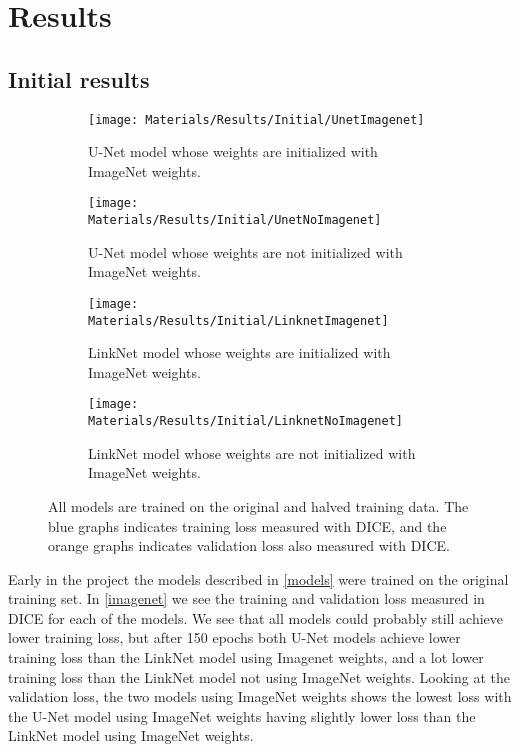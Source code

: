 \section{Results}
\subsection{Initial results}
\begin{figure}
	\centering
	\begin{subfigure}[b]{0.24\linewidth}
		\centering
		\texttt{[image: Materials/Results/Initial/UnetImagenet]}
		\caption{U-Net model whose weights are initialized with ImageNet weights.}
	\end{subfigure}
	\hfill
	\begin{subfigure}[b]{0.24\linewidth}
		\centering
		\texttt{[image: Materials/Results/Initial/UnetNoImagenet]}
		\caption{U-Net model whose weights are not initialized with ImageNet weights.}
	\end{subfigure}
	\hfill
	\begin{subfigure}[b]{0.24\linewidth}
		\centering
		\texttt{[image: Materials/Results/Initial/LinknetImagenet]}
		\caption{LinkNet model whose weights are initialized with ImageNet weights.}
	\end{subfigure}
	\hfill
	\begin{subfigure}[b]{0.24\linewidth}
		\centering
		\texttt{[image: Materials/Results/Initial/LinknetNoImagenet]}
		\caption{LinkNet model whose weights are not initialized with ImageNet weights.}
	\end{subfigure}
	\caption{All models are trained on the original and halved training data. The blue graphs indicates training loss measured with DICE, and the orange graphs indicates validation loss also measured with DICE.}
	\label{imagenet}
\end{figure}
Early in the project the models described in \autoref{models} were trained on the original training set. In \autoref{imagenet} we see the training and validation loss measured in DICE for each of the models. We see that all models could probably still achieve lower training loss, but after 150 epochs both U-Net models achieve lower training loss than the LinkNet model using Imagenet weights, and a lot lower training loss than the LinkNet model not using ImageNet weights. Looking at the validation loss, the two models using ImageNet weights shows the lowest loss with the U-Net model using ImageNet weights having slightly lower loss than the LinkNet model using ImageNet weights.

